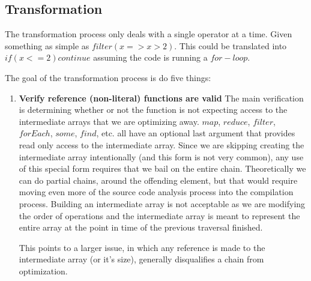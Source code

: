 \subsection{Transformation}

The transformation process only deals with a single operator at a time.  Given something as simple as $filter(x => x > 2)$.  This could be translated into $if (x <= 2) continue$ assuming the code is running a $for-loop$.

The goal of the transformation process is do five things:
\begin{enumerate}
  \item \textbf{Verify reference (non-literal) functions are valid}
    The main verification is determining whether or not the function is not expecting access to the intermediate arrays that we are optimizing away.  $map$, $reduce$, $filter$, $forEach$, $some$, $find$, etc.  all have an optional last argument that provides read only access to the intermediate array.  Since we are skipping creating the intermediate array intentionally (and this form is not very common), %
    any use of this special form requires that we bail on the entire chain. Theoretically we can do partial chains, around the offending element, but that would require moving even more of the source code analysis process into the compilation process.  Building an intermediate array is not acceptable as we are modifying the order of operations and the intermediate array is meant to represent the entire array at the point in time of the previous traversal finished.  

    This points to a larger issue, in which any reference is made to the intermediate array (or it's size), generally disqualifies a chain from optimization.
  

\end{enumerate}
